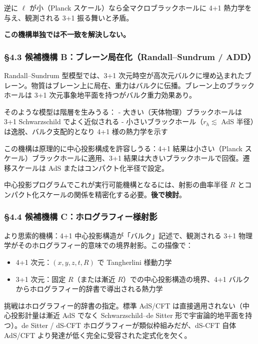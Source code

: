 \documentclass[a4paper,11pt]{ltjsarticle}
\theoremstyle{definition}
\providecommand{\tightlist}{\setlength{\itemsep}{0pt}\setlength{\parskip}{0pt}}
\begin{document}
逆に \(\ell\) が小（Planck スケール）なら全マクロブラックホールに 4+1
熱力学を与え、観測される 3+1 振る舞いと矛盾。

\textbf{この機構単独では不一致を解決しない。}

\subsubsection{§4.3 候補機構 B：ブレーン局在化（Randall--Sundrum /
ADD）}\label{ux5019ux88dcux6a5fux69cb-bux30d6ux30ecux30fcux30f3ux5c40ux5728ux5316randallsundrum-add}

Randall--Sundrum 型模型では、3+1
次元時空が高次元バルクに埋め込まれたブレーン。物質はブレーン上に局在、重力はバルクに伝播。ブレーン上のブラックホールは
3+1 次元事象地平面を持つがバルク重力効果あり。

そのような模型は階層を生みうる： - 大きい（天体物理）ブラックホールは
3+1 Schwarzschild でよく近似される -
小さいブラックホール（\(r_h \lesssim\) AdS
半径）は逸脱、バルク支配的となり 4+1 様の熱力学を示す

この機構は原理的に中心投影構成を許容しうる：4+1 結果は小さい（Planck
スケール）ブラックホールに適用、3+1
結果は大きいブラックホールで回復。遷移スケールは AdS
またはコンパクト化半径で設定。

中心投影プログラムでこれが実行可能機構となるには、射影の曲率半径 \(R\)
とコンパクト化スケールの関係を精密化する必要。\textbf{後で検討}。

\subsubsection{§4.4 候補機構
C：ホログラフィー様射影}\label{ux5019ux88dcux6a5fux69cb-cux30dbux30edux30b0ux30e9ux30d5ux30a3ux30fcux69d8ux5c04ux5f71}

より思索的機構：4+1 中心投影構造が「バルク」記述で、観測される 3+1
物理学がそのホログラフィー的意味での境界射影。この描像で：

\begin{itemize}
\tightlist
\item
  4+1 次元：\((x, y, z, t, R)\) で Tangherlini 様動力学
\item
  3+1 次元：固定 \(R\)（または漸近 \(R\)）での中心投影構造の境界、4+1
  バルクからホログラフィー的辞書で導出される熱力学
\end{itemize}

挑戦はホログラフィー的辞書の指定。標準 AdS/CFT
は直接適用されない（中心投影計量は漸近 AdS でなく Schwarzschild--de
Sitter 形で宇宙論的地平面を持つ）。de Sitter / dS-CFT
ホログラフィーが類似枠組みだが、dS-CFT 自体 AdS/CFT
より発達が低く完全に受容された定式化を欠く。
\end{document}
